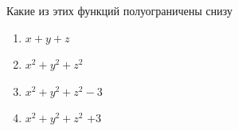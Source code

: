 Какие из этих функций полуограничены снизу

\begin{enumerate}[label=\arabic*)]
    \item \(x+y+z\)
    \item \(x^2+y^2+z^2\)
    \item \(x^2+y^2+z^2-3\)
    \item \(x^2+y^2+z^2\) +3
\end{enumerate}

